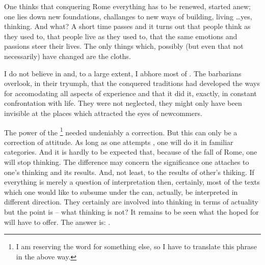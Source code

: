 {One thinks that conquering Rome everything has to be renewed, started 
anew; one lies down new foundations, challanges to new ways of 
building, living \ldots yes, thinking. And what? A short time passes 
and it turns out that people think as they used to, that people live 
as they used to, that the same emotions and passions steer their 
lives. The only things which, possibly (but even that not necessarily) 
have changed are the cloths. 

I do not believe in  and, to a large extent, I 
abhore most of . The barbarians overlook, in 
their tryumph, that the conquered traditions had developed the ways 
for accomodating all aspects of experience and that it did it, 
exactly, in constant confrontation with life. They were not 
neglected, they might only have been invisible at the places which 
attracted the eyes of newcommers. 

\pa
The power of the \footnote{I am 
reserving the word  for something else, so I have to 
translate this phrase in the above way.} needed undeniably a correction. 
But this can only be a correction of attitude. As long as one 
attempts , one will do it in familiar categories. And it 
is hardly to be expected that, because of the fall of Rome, one will 
stop thinking. The difference may concern the significance one attaches to 
one's thinking and its results. And, not least, to the results of 
other's thiking. If everything is merely a question of interpretation 
then, certainly, most of the texts which one would like to subsume 
under the  can, actually, be interpreted 
in different direction. They certainly are involved into thinking in 
terms of actuality but the point is -- what thinking is not? It 
remains to be seen what the hoped for  will 
have to offer. The answer is: .

}
